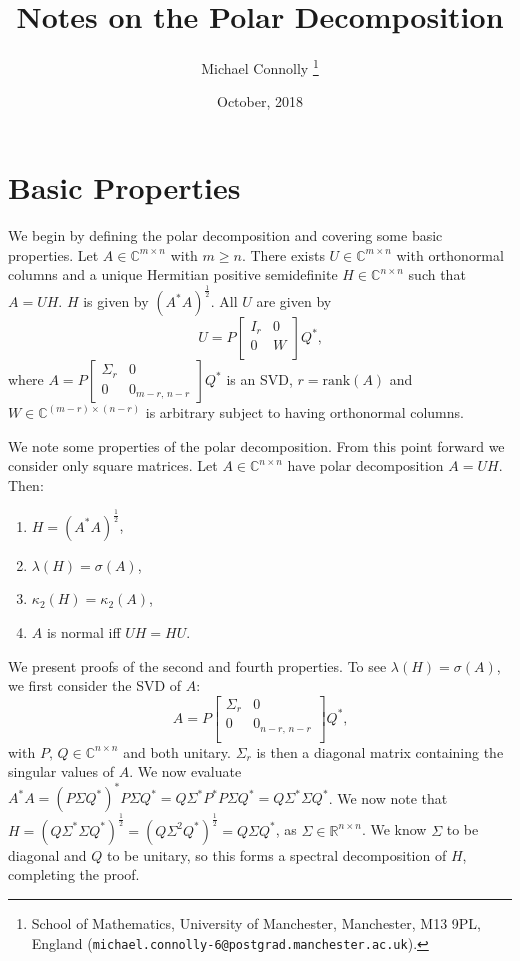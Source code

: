 \documentclass[12pt]{article}
\title{Notes on the Polar Decomposition}
\author{Michael Connolly%
        \thanks{%
                School of Mathematics,
                University of Manchester,
                Manchester, M13 9PL, England
                (\texttt{michael.connolly-6@postgrad.manchester.ac.uk}).
               }
}
\date{October, 2018}
\def\R{\mathbb{R}}
\def\C{\mathbb{C}}
\def\nbyn{n \times n}
\def\mbyn{m \times n}
\begin{document}
\maketitle

\section{Basic Properties}

We begin by defining the polar decomposition and covering some basic properties.
Let $A \in \C^{\mbyn}$ with $m \ge n$. There exists $U \in \C^{\mbyn}$ with
orthonormal columns and a unique Hermitian positive semidefinite
$H \in \C^{\nbyn}$ such that $A=UH$. $H$ is given by $(A^{*}A)^{\frac{1}{2}}$.
All $U$ are given by
\begin{equation}
  U=P
  \begin{bmatrix}
    I_r & 0 \\
    0 & W \\
  \end{bmatrix}
  Q^*\text{,}
\end{equation}
where $A = P \begin{bmatrix} \Sigma_r & 0 \\ 0 & 0_{m-r\text{, } n-r}\end{bmatrix} Q^*$
is an SVD, $r=\mathrm{rank}(A)$ and $W \in \C^{(m-r)\times (n-r)}$ is arbitrary subject
to having orthonormal columns.

We note some properties of the polar decomposition.
From this point forward we consider only square matrices.
Let $A \in \C^{\nbyn}$
have polar decomposition $A=UH$. Then:
\begin{enumerate}
\item $H=(A^*A)^{\frac{1}{2}}$,
\item $\lambda (H) = \sigma(A)$,
\item $\kappa_2(H) = \kappa_2(A)$,
\item $A$ is normal iff $UH=HU$.
\end{enumerate}

We present proofs of the second and fourth properties.
To see $\lambda(H) = \sigma(A)$, we first consider the SVD of $A$:
\begin{equation}
  A = P
  \begin{bmatrix}
    \Sigma_r & 0 \\
    0 & 0_{n-r\text{, }n-r} \\	
  \end{bmatrix} Q^*\text{,}
\end{equation}
with $P\text{, } Q \in \C^{\nbyn}$ and both unitary. $\Sigma_r$ is then a
diagonal matrix containing the singular values of $A$. We now evaluate
$A^*A = (P\Sigma Q^*)^*P\Sigma Q^* = Q\Sigma^* P^* P\Sigma Q^* = Q \Sigma^*
\Sigma Q^*$. We now note that
$H = ( Q \Sigma^* \Sigma Q^*)^{\frac{1}{2}} = ( Q \Sigma^2 Q^*)^{\frac{1}{2}}= Q
\Sigma Q^*$, as $\Sigma \in \R^{\nbyn}$. We know $\Sigma$ to be diagonal and $Q$
to be unitary, so this forms a spectral decomposition of $H$, completing the
proof.
\end{document}
